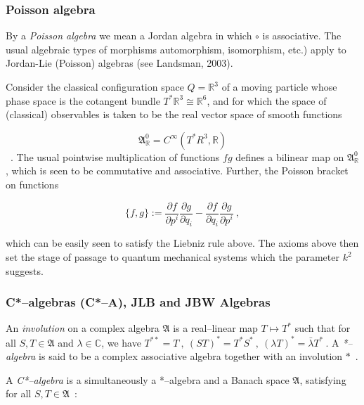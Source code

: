 \documentclass[12pt]{article}
\theoremstyle{plain}
\theoremstyle{definition}
\numberwithin{equation}{section}
\newcommand{\bC}{\mathbb{C}}
\newcommand{\bR}{\mathbb{R}}
\newcommand{\del}{\partial}
\newcommand{\med}{\medbreak}
\begin{document}
\subsubsection{Poisson algebra}


  By a \emph{Poisson algebra} we mean a Jordan algebra in which $\circ$ is associative. The 
usual algebraic types of morphisms automorphism, isomorphism, etc.) apply to Jordan-Lie 
(Poisson) algebras (see Landsman, 2003).


   Consider the classical configuration space $Q = \bR^3$ of a moving particle whose phase space 
is the cotangent bundle $T^* \bR^3 \cong \bR^6$, and for which the space of (classical) 
observables  is taken to be the real vector space of smooth functions

$$\mathfrak A^0_{\bR} = C^{\infty}(T^* R^3, \bR)$$~. The usual pointwise multiplication of 
functions $fg$ defines a bilinear map on $\mathfrak A^0_{\bR}$, which is seen to be 
commutative and associative. Further, the Poisson bracket on functions 

$$\{f, g \} := \frac{\del f}{\del p^i}  \frac{\del g}{\del q_i} - \frac{\del
f}{\del q_i} \frac{\del g}{\del p^i} ~,$$

 which can be easily seen to satisfy the Liebniz rule above. The axioms above then set the stage of passage to quantum mechanical systems which the parameter $k^2$ suggests.


\subsubsection{C*--algebras (C*--A), JLB and JBW Algebras} 

An \emph{involution} on a complex algebra $\mathfrak A$ is a real--linear map $T \mapsto T^*$ %
such that for all 
\bigbreak
$S, T \in \mathfrak A$ and $\lambda \in \bC$, we have $ T^{**} = T~,~ (ST)^* = T^* S^*~,~ %
(\lambda T)^* = \bar{\lambda} T^*~. $ 
\bigbreak
A \emph{*--algebra} is said to be a complex associative algebra together with an involution %
$*$~.


\med

A \emph{C*--algebra} is a simultaneously a *--algebra and a Banach space $\mathfrak A$, %
satisfying for all $S, T \in \mathfrak A$~:
\bigbreak
\end{document}
